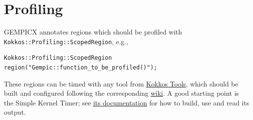 \documentclass{article}
\begin{document}
\section{Profiling}
GEMPICX annotates regions which should be profiled with \verb|Kokkos::Profiling::ScopedRegion|, e.g.,
\begin{verbatim}
Kokkos::Profiling::ScopedRegion region("Gempic::function_to_be_profiled()");
\end{verbatim}
These regions can be timed with any tool from \href{https://github.com/kokkos/kokkos-tools}{Kokkos Tools}, which should be built and configured following the corresponding \href{https://github.com/kokkos/kokkos-tools/wiki}{wiki}.
A good starting point is the Simple Kernel Timer; see \href{https://github.com/kokkos/kokkos-tools/wiki/SimpleKernelTimer}{its documentation} for how to build, use and read its output.
\end{document}
